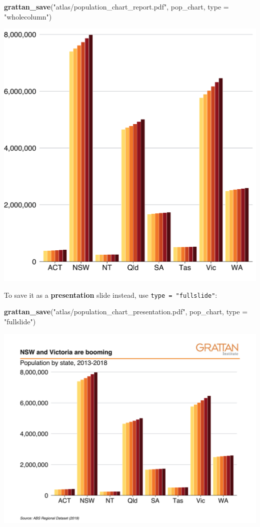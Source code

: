 \documentclass[]{book}
\newenvironment{Shaded}{\begin{snugshade}}{\end{snugshade}}
\newcommand{\DataTypeTok}[1]{\textcolor[rgb]{0.13,0.29,0.53}{#1}}
\newcommand{\KeywordTok}[1]{\textcolor[rgb]{0.13,0.29,0.53}{\textbf{#1}}}
\newcommand{\NormalTok}[1]{#1}
\newcommand{\StringTok}[1]{\textcolor[rgb]{0.31,0.60,0.02}{#1}}
\begin{document}
\begin{Shaded}
\begin{Highlighting}[]
\KeywordTok{grattan_save}\NormalTok{(}\StringTok{"atlas/population_chart_report.pdf"}\NormalTok{, pop_chart, }\DataTypeTok{type =} \StringTok{"wholecolumn"}\NormalTok{)}
\end{Highlighting}
\end{Shaded}

\includegraphics{atlas/population_chart_report.png}

To save it as a \textbf{presentation} slide instead, use \texttt{type\ =\ "fullslide"}:

\begin{Shaded}
\begin{Highlighting}[]
\KeywordTok{grattan_save}\NormalTok{(}\StringTok{"atlas/population_chart_presentation.pdf"}\NormalTok{, pop_chart, }\DataTypeTok{type =} \StringTok{"fullslide"}\NormalTok{)}
\end{Highlighting}
\end{Shaded}

\includegraphics{atlas/population_chart_presentation.png}
\end{document}

